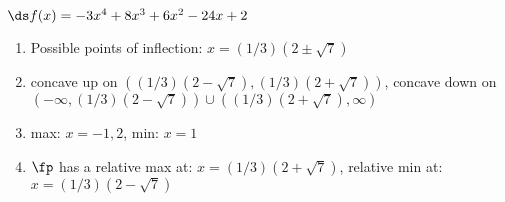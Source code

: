 {$\ds f(x) = -3 x^4+8 x^3+6 x^2-24 x+2$
}
{\begin{enumerate}[label=(\alph*)]
\item Possible points of inflection: $x=(1/3)(2\pm\sqrt{7})$
\item concave up on $((1/3)(2-\sqrt{7}),(1/3)(2+\sqrt{7}))$,
concave down on $(-\infty,(1/3)(2-\sqrt{7}))\cup((1/3)(2+\sqrt{7}),\infty)$
\item max: $x=-1,2$, min: $x=1$
\item $\fp$ has a relative max at: $x=(1/3)(2+\sqrt{7})$,
relative min at: $x= (1/3)(2-\sqrt{7})$
\end{enumerate}}
